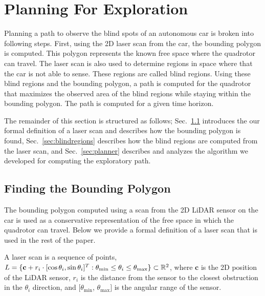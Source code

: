 
\section{Planning For Exploration}

Planning a path to observe the blind spots of an autonomous car is broken into
following steps. First, using the 2D laser scan from the car, the bounding
polygon is computed. This polygon represents the known free space where the
quadrotor can travel. The laser scan is also used to determine regions in space
where that the car is not able to sense. These regions are called blind
regions. Using these blind regions and the bounding polygon, a path is computed
for the quadrotor that maximizes the observed area of the blind regions while
staying within the bounding polygon. The path is computed for a given time
horizon.

The remainder of this section is structured as follows; Sec.~\ref{sec:poly}
introduces the our formal definition of a laser scan and describes how the
bounding polygon is found, Sec.~\ref{sec:blindregions} describes how the blind
regions are computed from the laser scan, and Sec.~\ref{sec:planner} describes
and analyzes the algorithm we developed for computing the exploratory path.


\subsection{Finding the Bounding Polygon}

\label{sec:poly}

The bounding polygon computed using a scan from the 2D LiDAR sensor on the car
is used as a conservative representation of the free space in which the
quadrotor can travel. Below we provide a formal definition of a laser scan that
is used in the rest of the paper.

\begin{definition}

    A laser scan is a sequence of points, $L = \{\mathbf{c} + r_i \cdot [\cos
    \theta_i, \sin \theta_i] ^ T : \theta_{\min} \leq \theta_i \leq
    \theta_{\max} \} \subset \mathbb{R}^2$, where $\mathbf{c}$ is the 2D position of
    the LiDAR sensor, $r_i$ is the distance from the sensor to the closest
    obstruction in the $\theta_i$ direction, and
    $[\theta_{\min}$, $\theta_{\max}]$ is the angular range of the sensor.

\end{definition}


